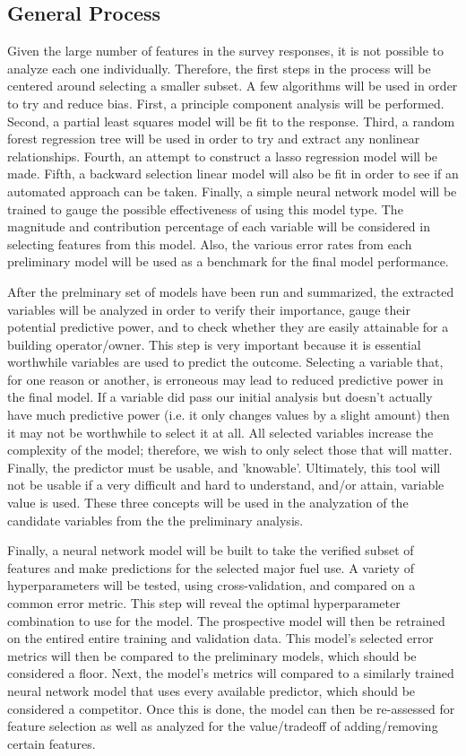 \subsection{General Process}

Given the large number of features in the survey responses, it is not possible to analyze each one individually.  Therefore, the first steps in the process will be centered around selecting a smaller subset.  A few algorithms will be used in order to try and reduce bias.  First, a principle component analysis will be performed.  Second, a partial least squares model will be fit to the response.  Third, a random forest regression tree will be used in order to try and extract any nonlinear relationships.  Fourth, an attempt to construct a lasso regression model will be made.  Fifth, a backward selection linear model will also be fit in order to see if an automated approach can be taken.  Finally, a simple neural network model will be trained to gauge the possible effectiveness of using this model type.  The magnitude and contribution percentage of each variable will be considered in selecting features from this model.  Also, the various error rates from each preliminary model will be used as a benchmark for the final model performance.

After the prelminary set of models have been run and summarized, the extracted variables will be analyzed in order to verify their importance, gauge their potential predictive power, and to check whether they are easily attainable for a building operator/owner.  This step is very important because it is essential worthwhile variables are used to predict the outcome.  Selecting a variable that, for one reason or another, is erroneous may lead to reduced predictive power in the final model.  If a variable did pass our initial analysis but doesn't actually have much predictive power (i.e. it only changes values by a slight amount) then it may not be worthwhile to select it at all.  All selected variables increase the complexity of the model; therefore, we wish to only select those that will matter.  Finally, the predictor must be usable, and 'knowable'.  Ultimately, this tool will not be usable if a very difficult and hard to understand, and/or attain, variable value is used.  These three concepts will be used in the analyzation of the candidate variables from the the preliminary analysis. 

Finally, a neural network model will be built to take the verified subset of features and make predictions for the selected major fuel use.  A variety of hyperparameters will be tested, using cross-validation, and compared on a common error metric.  This step will reveal the optimal hyperparameter combination to use for the model.  The prospective model will then be retrained on the entired entire training and validation data.  This model's selected error metrics will then be compared to the preliminary models, which should be considered a floor.  Next, the model's metrics will compared to a similarly trained neural network model that uses every available predictor, which should be considered a competitor.  Once this is done, the model can then be re-assessed for feature selection as well as analyzed for the value/tradeoff of adding/removing certain features.